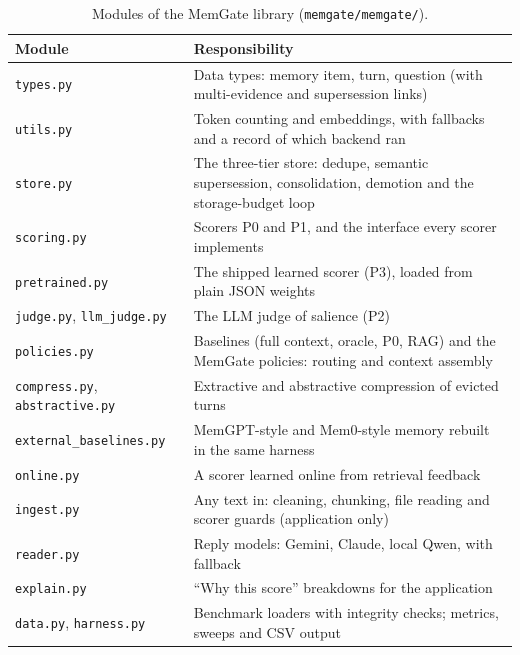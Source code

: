 \begin{table}[htbp]
\caption{Modules of the MemGate library (\texttt{memgate/memgate/}).}
\label{tab:modules}
\centering
\fontsize{10}{12}\selectfont
\begin{tabularx}{\textwidth}{@{}>{\raggedright\arraybackslash}p{4.4cm}X@{}}
\toprule
\textbf{Module} & \textbf{Responsibility} \\
\midrule
\texttt{types.py} & Data types: memory item, turn, question (with
multi-evidence and supersession links) \\
\texttt{utils.py} & Token counting and embeddings, with fallbacks and a
record of which backend ran \\
\texttt{store.py} & The three-tier store: dedupe, semantic supersession,
consolidation, demotion and the storage-budget loop \\
\texttt{scoring.py} & Scorers P0 and P1, and the interface every scorer
implements \\
\texttt{pretrained.py} & The shipped learned scorer (P3), loaded from plain
JSON weights \\
\texttt{judge.py}, \texttt{llm\_judge.py} & The LLM judge of salience (P2) \\
\texttt{policies.py} & Baselines (full context, oracle, P0, RAG) and the
MemGate policies: routing and context assembly \\
\texttt{compress.py}, \texttt{abstractive.py} & Extractive and abstractive
compression of evicted turns \\
\texttt{external\_baselines.py} & MemGPT-style and Mem0-style memory rebuilt
in the same harness \\
\texttt{online.py} & A scorer learned online from retrieval feedback \\
\texttt{ingest.py} & Any text in: cleaning, chunking, file reading and
scorer guards (application only) \\
\texttt{reader.py} & Reply models: Gemini, Claude, local Qwen, with
fallback \\
\texttt{explain.py} & ``Why this score'' breakdowns for the application \\
\texttt{data.py}, \texttt{harness.py} & Benchmark loaders with integrity
checks; metrics, sweeps and CSV output \\
\bottomrule
\end{tabularx}
\end{table}

